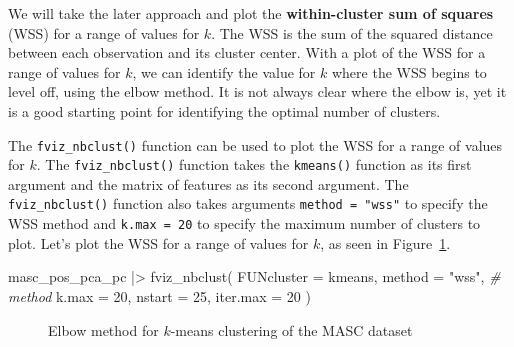 \documentclass[
  letterpaper,
]{book}
\newenvironment{Shaded}{\begin{snugshade}}{\end{snugshade}}
\newcommand{\AttributeTok}[1]{\textcolor[rgb]{0.00,0.00,0.00}{#1}}
\newcommand{\CommentTok}[1]{\textcolor[rgb]{0.00,0.00,0.00}{\textit{#1}}}
\newcommand{\DecValTok}[1]{\textcolor[rgb]{0.00,0.00,0.00}{#1}}
\newcommand{\FunctionTok}[1]{\textcolor[rgb]{0.00,0.00,0.00}{#1}}
\newcommand{\NormalTok}[1]{\textcolor[rgb]{0.00,0.00,0.00}{#1}}
\newcommand{\SpecialCharTok}[1]{\textcolor[rgb]{0.00,0.00,0.00}{#1}}
\newcommand{\StringTok}[1]{\textcolor[rgb]{0.00,0.00,0.00}{#1}}
\theoremstyle{definition}
\theoremstyle{remark}
\begin{document}
We will take the later approach and plot the \textbf{within-cluster sum
of squares} (WSS) for a range of values for \(k\). The WSS is the sum of
the squared distance between each observation and its cluster center.
With a plot of the WSS for a range of values for \(k\), we can identify
the value for \(k\) where the WSS begins to level off, using the elbow
method. It is not always clear where the elbow is, yet it is a good
starting point for identifying the optimal number of clusters.

The \texttt{fviz\_nbclust()} function can be used to plot the WSS for a
range of values for \(k\). The \texttt{fviz\_nbclust()} function takes
the \texttt{kmeans()} function as its first argument and the matrix of
features as its second argument. The \texttt{fviz\_nbclust()} function
also takes arguments \texttt{method\ =\ "wss"} to specify the WSS method
and \texttt{k.max\ =\ 20} to specify the maximum number of clusters to
plot. Let's plot the WSS for a range of values for \(k\), as seen in
Figure~\ref{fig-explore-masc-pos-kmeans-elbow}.

\begin{Shaded}
\begin{Highlighting}[]
\NormalTok{masc\_pos\_pca\_pc }\SpecialCharTok{|\textgreater{}}
  \FunctionTok{fviz\_nbclust}\NormalTok{(}
    \AttributeTok{FUNcluster =}\NormalTok{ kmeans,}
    \AttributeTok{method =} \StringTok{"wss"}\NormalTok{, }\CommentTok{\# method}
    \AttributeTok{k.max =} \DecValTok{20}\NormalTok{,}
    \AttributeTok{nstart =} \DecValTok{25}\NormalTok{,}
    \AttributeTok{iter.max =} \DecValTok{20}
\NormalTok{  )}
\end{Highlighting}
\end{Shaded}

\begin{figure}[!htb]


\caption{\label{fig-explore-masc-pos-kmeans-elbow}Elbow method for
\(k\)-means clustering of the MASC dataset}

\end{figure}%
\end{document}
